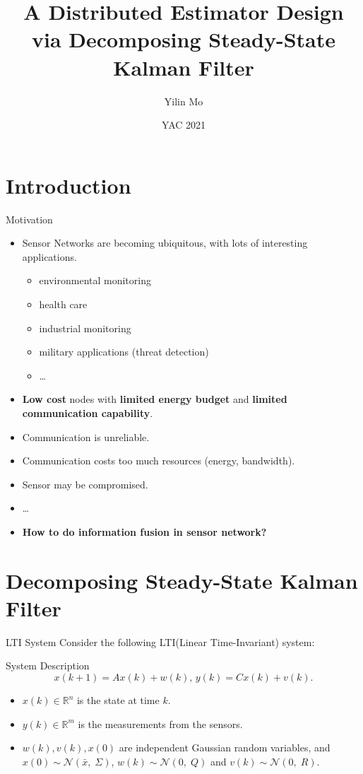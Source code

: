 \documentclass[10pt]{beamer}
\title[Kalman Filter]{A Distributed Estimator Design via Decomposing Steady-State Kalman Filter}
\author[Yilin Mo]{Yilin Mo}
\institute[Tsinghua]{Department of Automation, Tsinghua University}
\date[May 29, 2021]{YAC 2021}
\DeclareMathOperator{\1}{\textbf{1}}
\begin{document}
\begin{frame}
  \titlepage
\end{frame}


\section{Introduction}

\begin{frame}{Motivation}
  \begin{itemize}
    \item Sensor Networks are becoming ubiquitous, with lots of interesting applications.
      \begin{itemize}
	\item environmental monitoring
	\item health care
	\item industrial monitoring
	\item military applications (threat detection)
	\item \ldots
      \end{itemize}
    \item {\bf Low cost} nodes with {\bf limited energy budget} and {\bf limited communication capability}.
    \item Communication is unreliable. 
    \item Communication costs too much resources (energy, bandwidth). 
    \item Sensor may be compromised.
    \item \ldots
    \item \bf How to do information fusion in sensor network?
  \end{itemize}
\end{frame}

\section{Decomposing Steady-State Kalman Filter }

\begin{frame}{LTI System}
  Consider the following LTI(Linear Time-Invariant) system:
  \begin{block}{System Description}
    \begin{displaymath}
	x(k+1) = A x(k) + w(k),\, y(k) = C x(k) + v(k).
    \end{displaymath}
  \end{block}
  \begin{itemize}
    \item $x(k) \in \mathbb R^n$ is the state at time $k$.
    \item  $y(k) \in \mathbb R^m$ is the measurements from the sensors. 
    \item $w(k),v(k),x(0)$ are independent Gaussian random variables, and $x(0) \sim \mathcal N(\bar x,\;\Sigma)$, $w(k) \sim \mathcal N(0,\;Q)$ and $v(k) \sim \mathcal N(0,\;R)$. 
  \end{itemize}
\end{frame}
\end{document}
